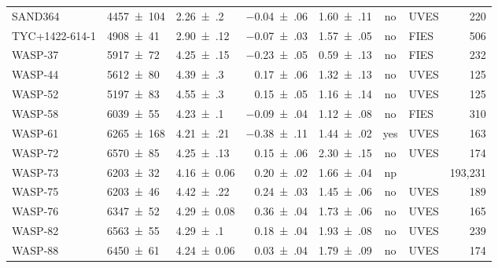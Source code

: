 \documentclass[fleqn]{fcup-thesis}
\newcommand{\object}[1]{#1}
\begin{document}
\begin{landscape}
\begin{ThreePartTable}
\begin{longtable}{lllrlclr}
        \object{SAND364}        &   \num{4457(104)}   &  \num{2.26(20)}\tnote{a}    &  \num{-0.04(06)}  &  \num{1.60(11)}  & no   &  UVES             &  220  \\
        \object{TYC+1422-614-1} &   \num{4908(41)}    &  \num{2.90(12)}\tnote{a}    &  \num{-0.07(03)}  &  \num{1.57(05)}  & no   &  FIES             &  506  \\
        \object{WASP-37}        &   \num{5917(72)}    &  \num{4.25(15)}             &  \num{-0.23(05)}  &  \num{0.59(13)}  & no   &  FIES             &  232  \\
        \object{WASP-44}        &   \num{5612(80)}    &  \num{4.39(30)}             &  \num{ 0.17(06)}  &  \num{1.32(13)}  & no   &  UVES             &  125  \\
        \object{WASP-52}        &   \num{5197(83)}    &  \num{4.55(30)}             &  \num{ 0.15(05)}  &  \num{1.16(14)}  & no   &  UVES             &  125  \\
        \object{WASP-58}        &   \num{6039(55)}    &  \num{4.23(10)}             &  \num{-0.09(04)}  &  \num{1.12(08)}  & no   &  FIES             &  310  \\
        \object{WASP-61}        &   \num{6265(168)}   &  \num{4.21(21)}\tnote{a}    &  \num{-0.38(11)}  &  \num{1.44(02)}  & yes  &  UVES             &  163  \\[5pt]
        \object{WASP-72}        &   \num{6570(85)}    &  \num{4.25(13)}             &  \num{ 0.15(06)}  &  \num{2.30(15)}  & no   &  UVES             &  174  \\
        \object{WASP-73}        &   \num{6203(32)}    &  \num{4.16(6)}\tnote{a}     &  \num{ 0.20(02)}  &  \num{1.66(04)}  & np   & \tnote{d}         & 193,231 \\
        \object{WASP-75}        &   \num{6203(46)}    &  \num{4.42(22)}\tnote{a}    &  \num{ 0.24(03)}  &  \num{1.45(06)}  & no   &  UVES             &  189  \\
        \object{WASP-76}        &   \num{6347(52)}    &  \num{4.29(8)}\tnote{a}     &  \num{ 0.36(04)}  &  \num{1.73(06)}  & no   &  UVES             &  165  \\
        \object{WASP-82}        &   \num{6563(55)}    &  \num{4.29(10)}\tnote{a}    &  \num{ 0.18(04)}  &  \num{1.93(08)}  & no   &  UVES             &  239  \\
        \object{WASP-88}        &   \num{6450(61)}    &  \num{4.24(6)}\tnote{a}     &  \num{ 0.03(04)}  &  \num{1.79(09)}  & no   &  UVES             &  174  \\

\end{longtable}
\end{ThreePartTable}
\end{landscape}
\end{document}
